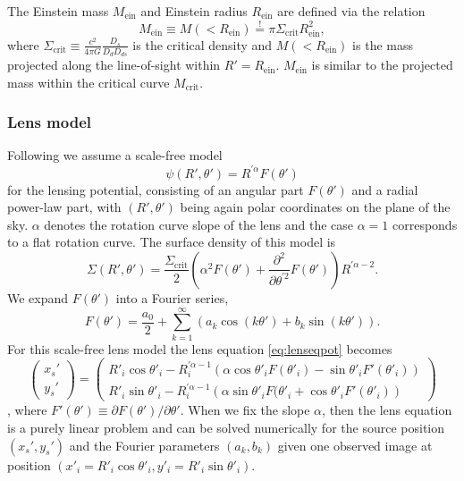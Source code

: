 \documentclass[useAMS,usenatbib]{mnras}
\begin{document}
The Einstein mass $M_\text{ein}$ and Einstein radius $R_\text{ein}$ are defined via the relation
\begin{equation*}
M_\text{ein} \equiv M(<R_\text{ein}) \overset{!}{=} \pi \Sigma_\text{crit} R_\text{ein}^2,
\end{equation*}
where $\Sigma_\text{crit} \equiv \frac{c^2}{4\pi G} \frac{D_s}{D_d D_{ds}}$ is the critical density and $M(<R_\text{ein})$ is the mass projected along the line-of-sight within $R'=R_\text{ein}$. $M_\text{ein}$ is similar to the projected mass within the critical curve $M_\text{crit}$.

\subsubsection{Lens model} 

Following \citet{EvansWitt} we assume a scale-free model
\begin{equation}
\psi(R',\theta') = R^{'\alpha} F(\theta') \label{eq:scalefreemodel}
\end{equation}
for the lensing potential, consisting of an angular part $F(\theta')$ and a radial power-law part, with $(R',\theta')$ being again polar coordinates on the plane of the sky. $\alpha$ denotes the rotation curve slope of the lens and the case $\alpha = 1$ corresponds to a flat rotation curve. The surface density of this model is 
\begin{equation*}
\Sigma(R',\theta')= \frac{ \Sigma_\text{crit}}{2} \left(\alpha^2 F(\theta') + \frac{\partial^2}{\partial \theta^{'2}}F(\theta')\right) R^{'\alpha-2}.
\end{equation*}
We expand $F(\theta')$ into a Fourier series,
\begin{equation}
F(\theta') = \frac{a_0}{2} + \sum_{k=1}^{\infty} \left(a_k \cos(k\theta') + b_k \sin (k\theta') \right). \label{eq:Fourieransatz}
\end{equation}
For this scale-free lens model the lens equation \eqref{eq:lenseqpot} becomes
\begin{equation}
\begin{pmatrix} x_s' \\ y_s' \end{pmatrix} = \begin{pmatrix} R'_i \cos \theta'_i - R_i^{'\alpha-1} \left(\alpha \cos \theta'_i F(\theta'_i) - \sin \theta'_i F'(\theta'_i) \right) \\ R'_i \sin \theta'_i - R_i^{'\alpha-1} \left(\alpha \sin \theta'_i F(\theta'_i + \cos \theta'_i F'(\theta'_i) \right)\end{pmatrix}\label{eq:Fourierlenseq}
\end{equation}
\citep{EvansWitt}, where $F'(\theta') \equiv \partial F(\theta') / \partial \theta'$. When we fix the slope $\alpha$, then the lens equation is a purely linear problem and can be solved numerically for the source position $(x_s',y_s')$ and the Fourier parameters $(a_k,b_k)$ given one observed image at position $(x'_i=R'_i \cos \theta'_i,y'_i=R'_i \sin \theta'_i)$. 
\end{document}
